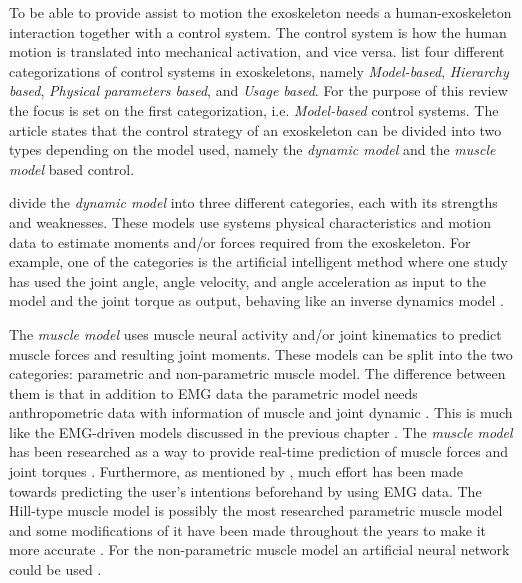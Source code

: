 To be able to provide assist to motion the exoskeleton needs a human-exoskeleton interaction together with a control system. 
The control system is how the human motion is translated into mechanical activation, and vice versa. 
\textcite{Anam2012} list four different categorizations of control systems in exoskeletons, namely \textit{Model-based}, \textit{Hierarchy based}, \textit{Physical parameters based}, and \textit{Usage based}. 
For the purpose of this review the focus is set on the first categorization, i.e. \textit{Model-based} control systems.
The article states that the control strategy of an exoskeleton can be divided into two types depending on the model used, namely the \textit{dynamic model} and the \textit{muscle model} based control. 

\citeauthor{Anam2012} divide the \textit{dynamic model} into three different categories, each with its strengths and weaknesses.
These models use systems physical characteristics and motion data to estimate moments and/or forces required from the exoskeleton. 
For example, one of the categories is the artificial intelligent method where one study has used the joint angle, angle velocity, and angle acceleration as input to the model and the joint torque as output, behaving like an inverse dynamics model \cite{Anam2012}.

The \textit{muscle model} uses muscle neural activity and/or joint kinematics to predict muscle forces and resulting joint moments. These models can be split into the two categories: parametric and non-parametric muscle model. 
The difference between them is that in addition to \ac{EMG} data the parametric model needs anthropometric data with information of muscle and joint dynamic \cite{Anam2012}.
This is much like the \ac{EMG}-driven models discussed in the previous chapter \cite{Pizzolato2015}.
The \textit{muscle model} has been researched as a way to provide real-time prediction of muscle forces and joint torques \cite{Anam2012, durandau, Pizzolato2015}. 
Furthermore, as mentioned by \textcite{Anam2012}, much effort has been made towards predicting the user's intentions beforehand by using \ac{EMG} data.
The Hill-type muscle model is possibly the most researched parametric muscle model and some modifications of it have been made throughout the years to make it more accurate \cite{Lloyd2003, Anam2012, Pizzolato2015, Lee14-1}.
For the non-parametric muscle model an artificial neural network could be used \cite{Kiguchi2012,Lee14-1}.  


